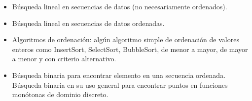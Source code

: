 \begin{itemize}
\item[\basic] Búsqueda lineal en secuencias de datos (no necesariamente ordenados).
\item[\basic] Búsqueda lineal en secuencias de datos ordenadas.
\item[\advanced]
  Algoritmos de ordenación: algún algoritmo simple de ordenación de valores
  enteros como InsertSort, SelectSort, BubbleSort, de menor a mayor, de mayor a
  menor y con criterio alternativo.
\item[\ultra] Búsqueda binaria para encontrar elemento en una secuencia ordenada.
  Búsqueda binaria en su uso general para encontrar puntos en funciones monótonas
  de dominio discreto.
\end{itemize}


